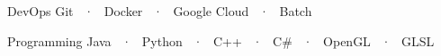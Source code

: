 
\begin{cvskills}

  \cvskill
    {DevOps} %
    {Git ~·~ Docker ~·~ Google Cloud ~·~ Batch} %

  \cvskill
    {Programming} %
    {Java ~·~ Python ~·~ C++ ~·~ C\# ~·~ OpenGL ~·~ GLSL} %

\end{cvskills}


